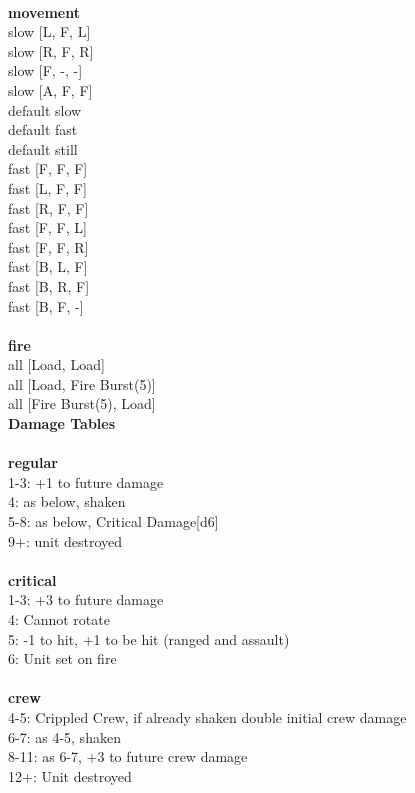 \ \\ {\bf movement } \\
slow [L, F, L] \\
slow [R, F, R] \\
slow [F, -, -] \\
slow [A, F, F] \\
default slow \\
default fast \\
default still \\
fast [F, F, F] \\
fast [L, F, F] \\
fast [R, F, F] \\
fast [F, F, L] \\
fast [F, F, R] \\
fast [B, L, F] \\
fast [B, R, F] \\
fast [B, F, -] \\
\ \\ {\bf fire } \\
all [Load, Load] \\
all [Load, Fire Burst(5)] \\
all [Fire Burst(5), Load] \\


{\bf Damage Tables} \\
\ \\ {\bf regular } \\
1-3: +1 to future damage \\
4: as below, shaken \\
5-8: as below, Critical Damage[d6] \\
9+: unit destroyed \\
\ \\ {\bf critical } \\
1-3: +3 to future damage \\
4: Cannot rotate \\
5: -1 to hit, +1 to be hit (ranged and assault) \\
6: Unit set on fire \\
\ \\ {\bf crew } \\
4-5: Crippled Crew, if already shaken double initial crew damage \\
6-7: as 4-5, shaken \\
8-11: as 6-7, +3 to future crew damage \\
12+: Unit destroyed \\


